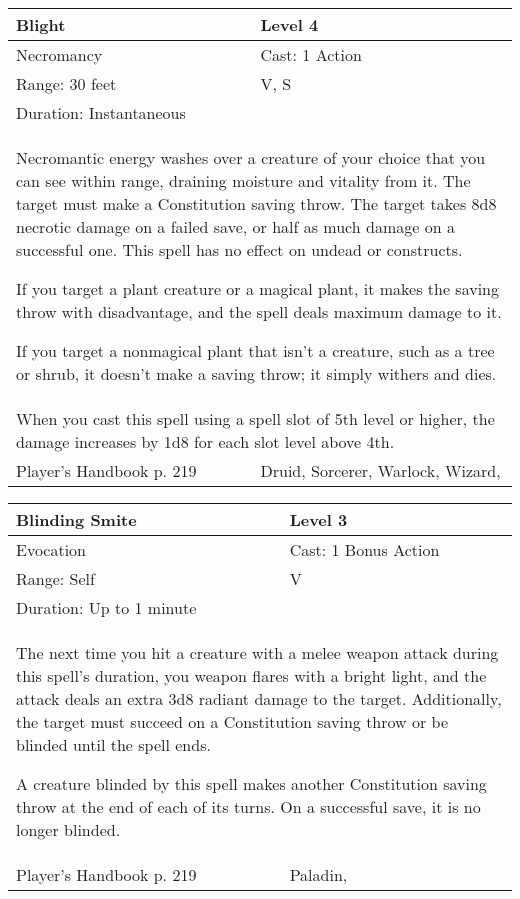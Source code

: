 \documentclass[11pt]{report}
\begin{document}
\begin{table}[H]
	\begin{tabular}{||p{6cm}|p{6cm}||}
		\hline\hline
		\bf{Blight} & Level 4\\ \hline
		Necromancy & Cast: 1 Action\\ \hline
		Range: 30 feet & V, S\\ \hline
		Duration: Instantaneous & \\ \hline
		\multicolumn{2}{||p{12cm}||}{Necromantic energy washes over a creature of your choice that you can see within range, draining moisture and vitality from it. The target must make a Constitution saving throw. The target takes 8d8 necrotic damage on a failed save, or half as much damage on a successful one. This spell has no effect on undead or constructs. 

If you target a plant creature or a magical plant, it makes the saving throw with disadvantage, and the spell deals maximum damage to it. 

If you target a nonmagical plant that isn’t a creature, such as a tree or shrub, it doesn’t make a saving throw; it simply withers and dies.}\\ \hline
		\multicolumn{2}{||p{12cm}||}{When you cast this spell using a spell slot of 5th level or higher, the damage increases by 1d8 for each slot level above 4th.}\\ \hline
Player's Handbook p. 219 & Druid, Sorcerer, Warlock, Wizard, \\ \hline\hline
	\end{tabular}
\end{table}

\begin{table}[H]
	\begin{tabular}{||p{6cm}|p{6cm}||}
		\hline\hline
		\bf{Blinding Smite} & Level 3\\ \hline
		Evocation & Cast: 1 Bonus Action\\ \hline
		Range: Self & V\\ \hline
		Duration: Up to 1 minute & \\ \hline
		\multicolumn{2}{||p{12cm}||}{The next time you hit a creature with a melee weapon attack during this spell’s duration, you weapon flares with a bright light, and the attack deals an extra 3d8 radiant damage to the target. Additionally, the target must succeed on a Constitution saving throw or be blinded until the spell ends. 

A creature blinded by this spell makes another Constitution saving throw at the end of each of its turns. On a successful save, it is no longer blinded.}\\ \hline
Player's Handbook p. 219 & Paladin, \\ \hline\hline
	\end{tabular}
\end{table}
\end{document}
